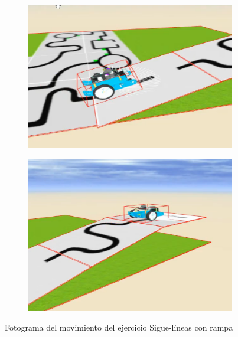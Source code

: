 \begin{figure}[h!]
\begin{subfigure}[b]{0.5\textwidth}
  \end{subfigure}
    \hfill
    \hfill
  \begin{subfigure}[b]{0.5\textwidth}
    \includegraphics[width=\textwidth, height=\textwidth]{rampa_ej2.png}
  \end{subfigure}
    \hfill
  \begin{subfigure}[b]{0.5\textwidth}
    \includegraphics[width=\textwidth, height=\textwidth]{rampa_ej3.png}
  \end{subfigure}
    \caption{Fotograma del movimiento del ejercicio Sigue-líneas con rampa}
    \label{fig:Sigue-líneas con rampa}
\end{figure}

